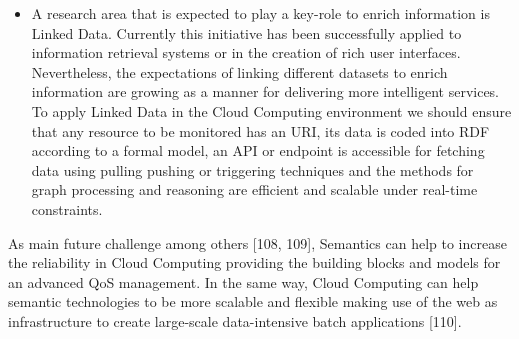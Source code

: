 \begin{itemize}
 \item A research area that is expected to play a key-role to enrich information 
is Linked Data. Currently this initiative has been successfully applied to 
information retrieval systems or in the creation of rich user interfaces. 
Nevertheless, the expectations of linking different datasets to enrich 
information are growing as a manner for delivering more intelligent services. To 
apply Linked Data in the Cloud Computing environment we should ensure that any 
resource to be monitored has an URI, its data is coded into RDF according to a 
formal model, an API or endpoint is accessible for fetching data using pulling 
pushing or triggering techniques and the methods for graph processing and 
reasoning are efficient and scalable under real-time constraints.
 
\end{itemize}

As main future challenge among others [108, 109], Semantics can help to increase 
the reliability in Cloud Computing providing the building blocks and models for 
an advanced QoS management. In the same way, Cloud Computing can help semantic 
technologies to be more scalable and flexible making use of the web as 
infrastructure to create large-scale data-intensive batch applications [110].

